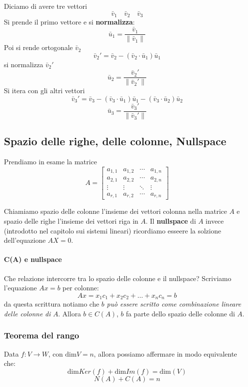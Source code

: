 \documentclass[x11names]{article}
\begin{document}
\noindent
Diciamo di avere tre vettori
\[
\bar{v}_{1} \quad \bar{v}_{2} \quad \bar{v}_{3}
\]
Si prende il primo vettore e si \textbf{normalizza}:
\[
\bar{u}_{1} = \frac{\bar{v}_{1}}{\|\bar{v}_{1}\|}
\]
Poi si rende ortogonale $\bar{v}_{2}$
\[
\bar{v}_{2}' = \bar{v}_{2} - \left(\bar{v}_{2} \cdot \bar{u}_{1}\right)\bar{u}_{1}
\]
si normalizza $\bar{v}_{2}'$
\[
\bar{u}_{2} = \frac{\bar{v}_{2}'}{\|\bar{v}_{2}'\|}
\]
Si itera con gli altri vettori
\[
\bar{v}_{3}' = \bar{v}_{3} - \left(\bar{v}_{3} \cdot \bar{u}_{1}\right)\bar{u}_{1} - \left(\bar{v}_{3} \cdot \bar{u}_{2}\right)\bar{u}_{2}
\]
\[
\bar{u}_{3} = \frac{\bar{v}_{3}'}{\|\bar{v}_{3}'\|}
\]


\subsection{Spazio delle righe, delle colonne, Nullspace}
Prendiamo in esame la matrice
\[
A=
\begin{bmatrix}a_{1,1}&a_{1,2}&\cdots &a_{1,n}\\a_{2,1}&a_{2,2}&\cdots &a_{2,n}\\ \vdots &\vdots &\ddots &\vdots \\a_{r,1}&a_{r,2}&\cdots &a_{r,n}\end{bmatrix}
\] 

Chiamiamo spazio delle colonne l'insieme dei vettori colonna nella matrice $A$ e spazio delle righe l'insieme dei vettori riga in  $A$. Il \textbf{nullspace} di $A$ invece (introdotto nel capitolo sui sistemi lineari) ricordiamo esseere la solzione dell'equazione  $AX = 0$.

\paragraph{C(A) e nullspace}

Che relazione intercorre tra lo spazio delle colonne e il nullspace?
Scriviamo l'equazione $Ax = b$ per colonne:
\[
	Ax = x_1c_1 + x_2c_{2} + \dots + x_{n}c_{n} = b
\] 
da questa scrittura notiamo che \textit{$b$ può essere scritto come combinazione lineare delle colonne di $A$}. Allora $b \in C\left(A\right)$, $b$ fa parte dello spazio delle colonne di $A$. 

\begin{center}
	\colorbox{myred}{\begin{minipage}{5.75in}
			\begin{redes}{}
								\subsubsection{Teorema del rango}
				Data $f: V \to W$, con $\text{dim}V = n$, allora possiamo affermare in modo equivalente che:
				\[
				\text{dim}Ker(f) + \text{dim}Im(f) = \text{dim}(V)
				\]
				\[
				N(A) + C(A) = n
				\]
				
				
			\end{redes}
	\end{minipage}}        
\end{center}
\end{document}
